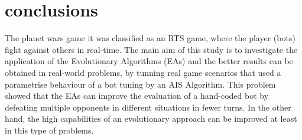 \documentclass[conference]{IEEEtran}
\begin{document}
\section{conclusions}
The planet wars game it was classified as an RTS game, where the player (bots) fight against others in real-time. The main aim of this study is to investigate the application of the Evolutionary Algorithms (EAs) and the better results can be obtained in real-world problems, by tunning real game scenarios that used a parametrise behaviour of a bot tuning by an AIS Algorithm. This problem showed that the EAs can improve the evaluation of a hand-coded bot by defeating multiple opponents in different situations in fewer turns. In the other hand, the high capabilities of an evolutionary approach can be improved at least in this type of problems.



%
%

\end{document}
